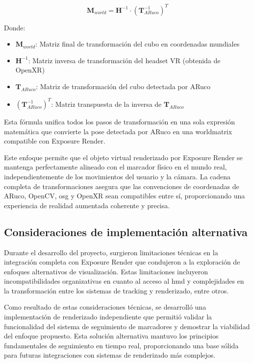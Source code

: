 $$\mathbf{M}_{world} = \mathbf{H}^{-1} \cdot (\mathbf{T}_{ARuco}^{-1})^T$$

Donde:
\begin{itemize}
    \item $\mathbf{M}_{world}$: Matriz final de transformación del cubo en coordenadas mundiales
    \item $\mathbf{H}^{-1}$: Matriz inversa de transformación del headset VR (obtenida de OpenXR)
    \item $\mathbf{T}_{ARuco}$: Matriz de transformación del cubo detectada por ARuco
    \item $(\mathbf{T}_{ARuco}^{-1})^T$: Matriz transpuesta de la inversa de $\mathbf{T}_{ARuco}$
\end{itemize}

Esta fórmula unifica todos los pasos de transformación en una sola expresión matemática que convierte la \gls{pose} detectada por ARuco en una \gls{worldmatrix} compatible con Exposure Render.

Este enfoque permite que el objeto virtual renderizado por Exposure Render se mantenga perfectamente alineado con el marcador físico en el mundo real, independientemente de los movimientos del usuario y la cámara. La cadena completa de transformaciones asegura que las convenciones de coordenadas de ARuco, OpenCV, \acrshort{osg} y OpenXR sean compatibles entre sí, proporcionando una experiencia de realidad aumentada coherente y precisa.

\subsection{Consideraciones de implementación alternativa}

Durante el desarrollo del proyecto, surgieron limitaciones técnicas en la integración completa con Exposure Render que condujeron a la exploración de enfoques alternativos de visualización. Estas limitaciones incluyeron incompatibilidades organizativas en cuanto al acceso al \acrshort{hmd} y complejidades en la transformación entre los sistemas de \gls{tracking} y renderizado, entre otros.

Como resultado de estas consideraciones técnicas, se desarrolló una implementación de renderizado independiente que permitió validar la funcionalidad del sistema de seguimiento de marcadores y demostrar la viabilidad del enfoque propuesto. Esta solución alternativa mantuvo los principios fundamentales de seguimiento en tiempo real, proporcionando una base sólida para futuras integraciones con sistemas de renderizado más complejos.

